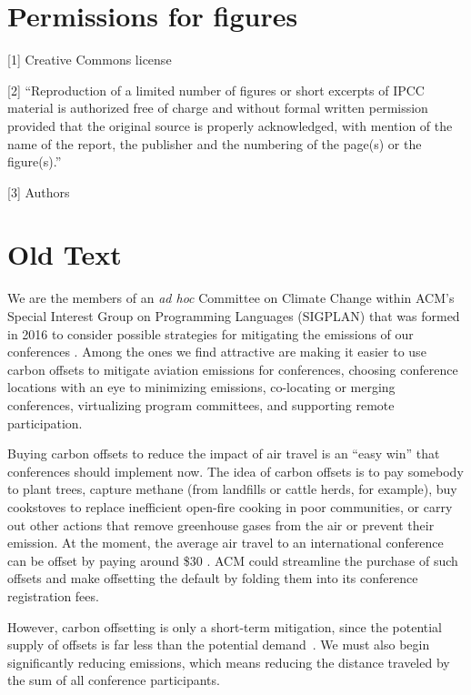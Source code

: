 \documentclass[12pt]{article}
\begin{document}



\iflater
\newpage
\section*{Permissions for figures}

[1] Creative Commons license

[2] ``Reproduction of a limited number of figures or short excerpts of IPCC material is authorized free of charge and without formal written permission provided that the original source is properly acknowledged, with mention of the name of the report, the publisher and the numbering of the page(s) or the figure(s).''

[3] Authors

\section*{Old Text}

We are the members of an {\em ad hoc} Committee on Climate Change within
ACM's Special Interest Group on Programming Languages (SIGPLAN) that was
formed in 2016 to consider possible strategies for mitigating the emissions
of our conferences \cite{ClimateCommitteReport}. Among the ones we find 
attractive are making it easier to use carbon offsets to mitigate aviation
emissions for conferences, choosing conference locations with an eye to
minimizing emissions, co-locating or merging conferences, virtualizing
program committees, and supporting remote participation.

Buying carbon offsets to reduce the impact of air travel
\cite{CarbonOFfsetReport} is an ``easy win'' that conferences should
implement now.  The idea of carbon offsets is to pay somebody to plant
trees, capture methane (from landfills or cattle herds, for example), buy
cookstoves to replace inefficient open-fire cooking in poor communities, or
carry out other actions that remove greenhouse gases from the air or prevent
their emission. At the moment, the average air travel to an international
conference can be offset by paying around \$30 \cite{CarbonOFfsetReport}.
ACM could streamline the purchase of such offsets and make offsetting the
default by folding them into its conference registration fees.

However, carbon offsetting is only a short-term mitigation, since the
potential supply of offsets is far less than the potential
demand~\cite{SEI-Report}. We must also begin significantly reducing
emissions, which means reducing the distance traveled by the sum of all
conference participants.
\end{document}

